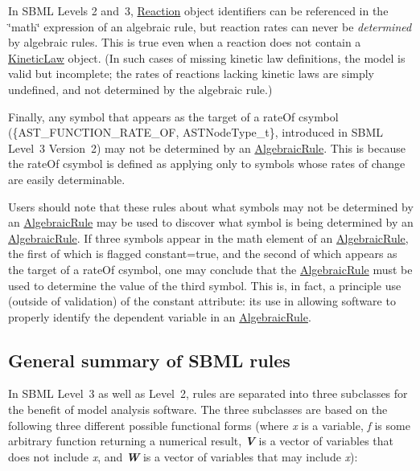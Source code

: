 In S\+B\+ML Levels 2 and~3, \hyperlink{class_reaction}{Reaction} object identifiers can be referenced in the \char`\"{}math\char`\"{} expression of an algebraic rule, but reaction rates can never be {\itshape determined} by algebraic rules. This is true even when a reaction does not contain a \hyperlink{class_kinetic_law}{Kinetic\+Law} object. (In such cases of missing kinetic law definitions, the model is valid but incomplete; the rates of reactions lacking kinetic laws are simply undefined, and not determined by the algebraic rule.)

Finally, any symbol that appears as the target of a rate\+Of csymbol (\{A\+S\+T\+\_\+\+F\+U\+N\+C\+T\+I\+O\+N\+\_\+\+R\+A\+T\+E\+\_\+\+OF, A\+S\+T\+Node\+Type\+\_\+t\}, introduced in S\+B\+ML Level~3 Version~2) may not be determined by an \hyperlink{class_algebraic_rule}{Algebraic\+Rule}. This is because the rate\+Of csymbol is defined as applying only to symbols whose rates of change are easily determinable.

Users should note that these rules about what symbols may not be determined by an \hyperlink{class_algebraic_rule}{Algebraic\+Rule} may be used to discover what symbol is being determined by an \hyperlink{class_algebraic_rule}{Algebraic\+Rule}. If three symbols appear in the math element of an \hyperlink{class_algebraic_rule}{Algebraic\+Rule}, the first of which is flagged constant={\ttfamily true}, and the second of which appears as the target of a rate\+Of csymbol, one may conclude that the \hyperlink{class_algebraic_rule}{Algebraic\+Rule} must be used to determine the value of the third symbol. This is, in fact, a principle use (outside of validation) of the constant attribute\+: its use in allowing software to properly identify the dependent variable in an \hyperlink{class_algebraic_rule}{Algebraic\+Rule}.\hypertarget{classdoc__rules__general__summary_rules-general}{}\subsection{General summary of S\+B\+M\+L rules}\label{classdoc__rules__general__summary_rules-general}
In S\+B\+ML Level~3 as well as Level~2, rules are separated into three subclasses for the benefit of model analysis software. The three subclasses are based on the following three different possible functional forms (where {\itshape x} is a variable, {\itshape f} is some arbitrary function returning a numerical result, {\bfseries {\itshape V}} is a vector of variables that does not include {\itshape x}, and {\bfseries {\itshape W}} is a vector of variables that may include {\itshape x})\+:

